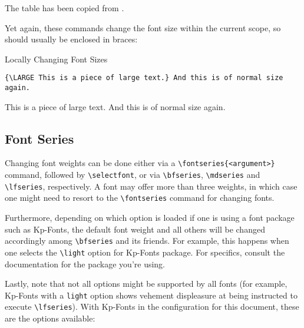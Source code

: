 \documentclass[a4paper,oneside,11pt]{article}
\newcommand\comm[1]{\texttt{\textbackslash#1}}
\newcommand\code[1]{\texttt{#1}}
\begin{document}
The table has been copied from \cite{wikibooks:fonts}.

Yet again, these commands change the font size within the current scope, so should
usually be enclosed in braces:

\begin{titled-frame}
{\textsf{Locally Changing Font Sizes}}
\vspace{-1em}
\begin{verbatim}
{\LARGE This is a piece of large text.} And this is of normal size again.
\end{verbatim}
{\LARGE This is a piece of large text.} And this is of normal size again.
\end{titled-frame}

\subsection{Font Series}
\label{subsec:font-series}

Changing font weights can be done either via a \comm{fontseries\{<argument>\}}
command,    followed   by    \comm{selectfont},   or    via   \comm{bfseries},
\comm{mdseries} and \comm{lfseries}, respectively. A  font may offer more than
three weights, in which case one might need to resort to the \comm{fontseries}
command for changing fonts.

Furthermore,  depending on  which option  is  loaded if  one is  using a  font
package  such as  Kp-Fonts, the  default font  weight and  all others  will be
changed accordingly  among \comm{bfseries} and its  friends. For example, this
happens when  one selects  the \comm{light}  option for  Kp-Fonts package. For
specifics, consult the documentation for the package you're using.

Lastly,  note that  not  all options  might  be supported  by  all fonts  (for
example,  Kp-Fonts  with  a  \code{light} option  shows  vehement  displeasure
at  being  instructed  to   execute  \comm{lfseries}). With  Kp-Fonts  in  the
configuration for this document, these are the options available:
\end{document}
